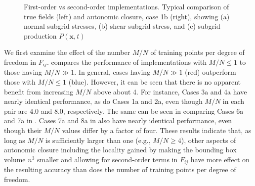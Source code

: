 %
\begin{figure}
	\centering %
	\label{F:CL18a}
\end{figure}
%
\begin{figure}
	\ContinuedFloat
	\centering %
	\label{F:CL18b}
\end{figure}
%
\begin{figure}
	\ContinuedFloat
	\centering %
	\label{F:CL18c}
\end{figure}
%
\begin{figure}
	\ContinuedFloat
	\caption{First-order vs second-order implementations. Typical comparison of  true fields (left) and autonomic closure, case 1b (right), showing (a) normal subgrid stresses, (b) shear subgrid stress, and (c) subgrid production $P(\mathbf{x},t)$}
	\label{F:CL18}
\end{figure}
%
%
We first examine the effect of the number  $M/N$ of training points per degree of freedom 
in $F_{ij}$.   compares the performance of implementations with $M/N \leq 1$  to those having $M/N \gg 1$. In general, cases having  $M/N \gg 1$ (red) outperform those with  $M/N \leq 1$ (blue). However, it can be seen that there is no apparent benefit from increasing $M/N$ above about 4. For instance, Cases 3a and 4a have nearly identical performance, as do Cases 1a and 2a, even though  $M/N$ in each pair are 4.0 and 8.0, respectively. The same can be seen in comparing Cases 6a and 7a in . Cases 7a and 8a in  also have nearly identical performance, even though their $M/N$ values differ by a factor of four. These results indicate that, as long as $M/N$  is sufficiently larger than one (e.g., $M/N \geq 4$), other aspects of autonomic closure including the locality gained by making the bounding box volume  $n^3$ smaller and allowing for second-order terms in $F_{ij}$  have more effect on the resulting accuracy than does the number of training points per degree of freedom.

